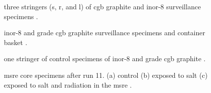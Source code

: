 \documentclass[ms,a4paper]{memoir}
\newcommand*{\mrsarchive}{../../msr-archive}%
\begin{document}


\begin{figure}[H]
  \centering
  \centering
  \caption{three stringers (s, r, and l) of cgb graphite and inor-8 surveillance specimens \parencite[figure 4.7]{ornl-3872}.}
\end{figure}

\begin{figure}[H]
  \centering
  \centering
  \caption{inor-8 and grade cgb graphite surveillance specimens and container basket \parencite[figure 4.8]{ornl-3872}.}
\end{figure}

\begin{figure}[H]
  \centering
  \centering
  \caption{one stringer of control specimens of inor-8 and grade cgb graphite \parencite[figure 4.9]{ornl-3872}.}
\end{figure}


\begin{figure}[H]
  \centering
  \centering
  \caption{msre core specimens after run 11. (a) control (b) exposed to salt (c) exposed to salt and radiation in the msre \parencite[figure 16.2]{ornl-4191}.}
\end{figure}
\end{document}
